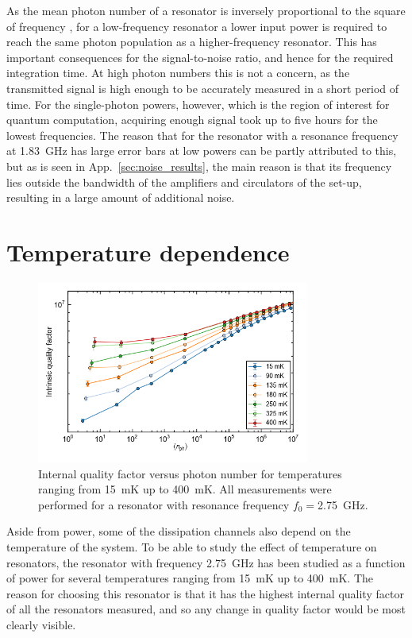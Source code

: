 As the mean photon number of a resonator is inversely proportional to the square of frequency \cite{bruno2015reducing}, for a low-frequency resonator a lower input power is required to reach the same photon population as a higher-frequency resonator. This has important consequences for the signal-to-noise ratio, and hence for the required integration time. At high photon numbers this is not a concern, as the transmitted signal is high enough to be accurately measured in a short period of time. For the single-photon powers, however, which is the region of interest for quantum computation, acquiring enough signal took up to five hours for the lowest frequencies. The reason that for the resonator with a resonance frequency at \SI{1.83}{\giga \hertz} has large error bars at low powers can be partly attributed to this, but as is seen in App.~\ref{sec:noise_results}, the main reason is that its frequency lies outside the bandwidth of the amplifiers and circulators of the set-up, resulting in a large amount of additional noise.

\section{Temperature dependence}
\label{sec:resonator:results:emperature_dependence}
\begin{figure}
    \centering
    \includegraphics[width=0.8\textwidth]{Figures/DRIE/Qi_vs_n_photon_temperature_dependence.png}
    \caption{Internal quality factor versus photon number for temperatures ranging from \SI{15}{\milli \kelvin} up to \SI{400}{\milli \kelvin}. All measurements were performed for a resonator with resonance frequency $f_0 = $\SI{2.75}{\giga \hertz}.}
    \label{fig:Qi_vs_n_photon_temperature_dependence}
\end{figure}

Aside from power, some of the dissipation channels also depend on the temperature of the system. To be able to study the effect of temperature on resonators, the resonator with frequency \SI{2.75}{\giga \hertz} has been studied as a function of power for several temperatures ranging from \SI{15}{\milli \kelvin} up to \SI{400}{\milli \kelvin}. The reason for choosing this resonator is that it has the highest internal quality factor of all the resonators measured, and so any change in quality factor would be most clearly visible.

